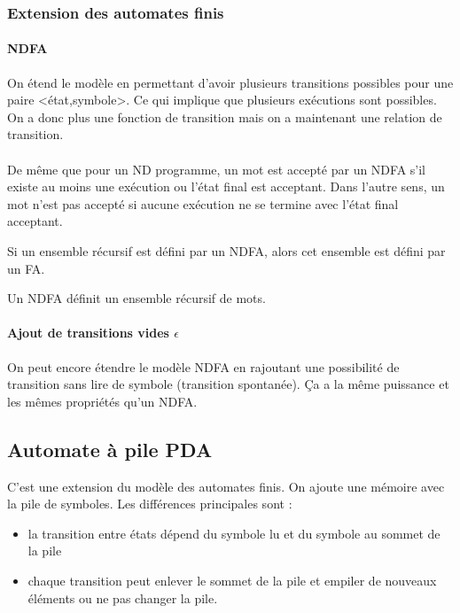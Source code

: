 \subsubsection{Extension des automates finis}
\label{ssub:automate_fini_nd}
\paragraph{NDFA} On étend le modèle en permettant d'avoir plusieurs transitions possibles pour 
une paire <état,symbole>. Ce qui implique que plusieurs exécutions sont 
possibles. On a donc plus une fonction de transition mais on a maintenant une
relation de transition.

\paragraph{} De même que pour un ND programme, un mot est accepté par un NDFA 
s’il existe au moins une exécution ou l'état final est acceptant. Dans l'autre 
sens, un 
mot n'est pas accepté si aucune exécution ne se termine avec l'état final 
acceptant.

\begin{myprop}
	Si un ensemble récursif est défini par un NDFA, alors cet ensemble est 
	défini par un FA.
\end{myprop}

\begin{myprop}
	Un NDFA définit un ensemble récursif de mots.
\end{myprop}

\paragraph{Ajout de transitions vides $\epsilon$} On peut encore étendre le modèle NDFA en 
rajoutant une possibilité de transition sans lire de symbole (transition 
spontanée). Ça a la même puissance et les mêmes propriétés qu'un NDFA.


\subsection{Automate à pile PDA}
\label{sub:automate_pile}
C'est une extension du modèle des automates finis. On ajoute une mémoire avec 
la pile de symboles.
Les différences principales sont :
\begin{itemize}
	\item la transition entre états dépend du symbole lu et du symbole au 
		sommet de la pile
	\item	chaque transition peut enlever le sommet de la pile et empiler 
		de nouveaux éléments ou ne pas changer la pile.
\end{itemize}

